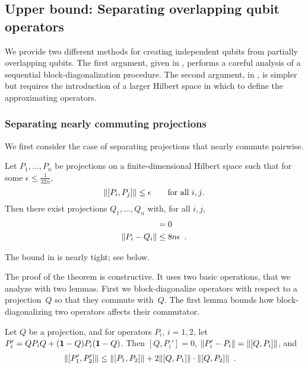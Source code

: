\documentclass[preprintnumbers,11pt,onecolumn]{article}
\begin{document}
\subsection{Upper bound: Separating overlapping qubit operators} \label{s:packingqubitsupperbound}

We provide two different methods for creating independent qubits from partially overlapping qubits.  The first argument, given in , performs a careful analysis of a sequential block-diagonalization procedure.  The second argument, in , is simpler but requires the introduction of a larger Hilbert space in which to define the approximating operators.  


\subsubsection{Separating nearly commuting projections} \label{s:blockdiagonalization}

We first consider the case of separating projections that nearly commute pairwise.  

\begin{theorem} \label{t:manynearlycommutingprojections}
Let $P_1, \ldots, P_n$ be projections on a finite-dimensional Hilbert space such that for some $\epsilon \leq \tfrac{1}{32 n}$, 
\begin{equation*}
{\| [P_i, P_j] \|} \leq \epsilon \qquad \text{for all $i, j$.}
\end{equation*}
Then there exist projections $Q_1, \ldots, Q_n$ with, for all $i, j$, 
\begin{align*}
[Q_i, Q_j] &= 0 \\
\norm{P_i - Q_i} &\leq 8 n \epsilon
 \enspace .
\end{align*}
\end{theorem}

The bound in  is nearly tight; see  below.  

The proof of the theorem is constructive.  It uses two basic operations, that we analyze with two lemmas.  First we block-diagonalize operators with respect to a projection~$Q$ so that they commute with~$Q$.  The first lemma bounds how block-diagonalizing two operators affects their commutator.  

\begin{lemma} \label{t:blockdiagonalizedcommutator}
Let $Q$ be a projection, and for operators $P_i$, $i = 1, 2$, let $P_i' = Q P_i Q + (\boldsymbol{1}-Q) P_i (\boldsymbol{1}-Q)$.  Then $[Q, P_i'] = 0$, ${\| P_i' - P_i \|} = {\| [Q, P_i] \|}$, and 
\begin{equation*}\begin{split}
{\| [P_1', P_2'] \|} &\leq {\| [P_1, P_2] \|} + 2 {\| [Q, P_1] \|} \cdot {\| [Q, P_2] \|}
 \enspace .
\end{split}\end{equation*}
\end{lemma}
\end{document}
